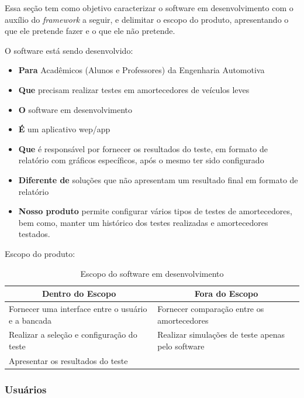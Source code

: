 	Essa seção tem como objetivo caracterizar o software em desenvolvimento com o auxílio do \textit{framework} a seguir, e delimitar o escopo do produto, apresentando o que ele pretende fazer e o que ele não pretende.


	O software está sendo desenvolvido:
	\begin{itemize}
		\item \textbf{Para} Acadêmicos (Alunos e Professores) da Engenharia Automotiva
		\item \textbf{Que} precisam realizar testes em amortecedores de veículos leves
		\item \textbf{O} software em desenvolvimento
		\item \textbf{É} um aplicativo wep/app
		\item \textbf{Que} é responsável por fornecer os resultados do teste, em formato de relatório com gráficos específicos, após o mesmo ter sido configurado
		\item \textbf{Diferente de} soluções que não apresentam um resultado final em formato de relatório
		\item \textbf{Nosso produto} permite configurar vários tipos de testes de amortecedores, bem como, manter um histórico dos testes realizadas e amortecedores testados.
	\end{itemize}

	Escopo do produto:
	
	\begin{table}[h]
		\centering
		\begin{tabular}{@{}ll@{}}
			\toprule
			\multicolumn{1}{c}{\textbf{Dentro do Escopo}}      & \multicolumn{1}{c}{\textbf{Fora do Escopo}} \\ \midrule
			Fornecer uma interface entre o usuário e a bancada & Fornecer comparação entre os amortecedores  \\ \midrule
			Realizar a seleção e configuração do teste         & Realizar simulações de teste apenas pelo software \\ \midrule
			Apresentar os resultados do teste                  &                                             \\ \bottomrule
		\end{tabular}
		\label{my-label}
		\caption{Escopo do software em desenvolvimento}
	\end{table}



\subsubsection{Usuários}

